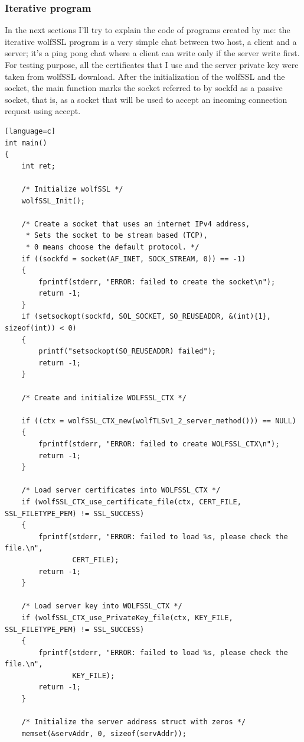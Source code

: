 \documentclass[a4paper,12pt]{article}
\begin{document}
\subsubsection{Iterative program}
In the next sections I'll try to explain the code of programs created by me:
the iterative wolfSSL program is a very simple chat between two host, a client and a server; it's a ping pong chat where a client can write only if the server write first.
For testing purpose, all the certificates that I use and the server private key were taken from wolfSSL download.
After the initialization of the wolfSSL and the socket, the main function marks the socket referred to by sockfd as a passive socket, that is, as a socket that will be used to accept an incoming connection request using accept.
\begin{lstlisting}[caption={int main() of iterative TLS server},captionpos=b][language=c]
int main()
{
    int ret;

    /* Initialize wolfSSL */
    wolfSSL_Init();

    /* Create a socket that uses an internet IPv4 address,
     * Sets the socket to be stream based (TCP),
     * 0 means choose the default protocol. */
    if ((sockfd = socket(AF_INET, SOCK_STREAM, 0)) == -1)
    {
        fprintf(stderr, "ERROR: failed to create the socket\n");
        return -1;
    }
    if (setsockopt(sockfd, SOL_SOCKET, SO_REUSEADDR, &(int){1}, sizeof(int)) < 0)
    {
        printf("setsockopt(SO_REUSEADDR) failed");
        return -1;
    }

    /* Create and initialize WOLFSSL_CTX */

    if ((ctx = wolfSSL_CTX_new(wolfTLSv1_2_server_method())) == NULL)
    {
        fprintf(stderr, "ERROR: failed to create WOLFSSL_CTX\n");
        return -1;
    }

    /* Load server certificates into WOLFSSL_CTX */
    if (wolfSSL_CTX_use_certificate_file(ctx, CERT_FILE, SSL_FILETYPE_PEM) != SSL_SUCCESS)
    {
        fprintf(stderr, "ERROR: failed to load %s, please check the file.\n",
                CERT_FILE);
        return -1;
    }

    /* Load server key into WOLFSSL_CTX */
    if (wolfSSL_CTX_use_PrivateKey_file(ctx, KEY_FILE, SSL_FILETYPE_PEM) != SSL_SUCCESS)
    {
        fprintf(stderr, "ERROR: failed to load %s, please check the file.\n",
                KEY_FILE);
        return -1;
    }

    /* Initialize the server address struct with zeros */
    memset(&servAddr, 0, sizeof(servAddr));


\end{lstlisting}
\end{document}
